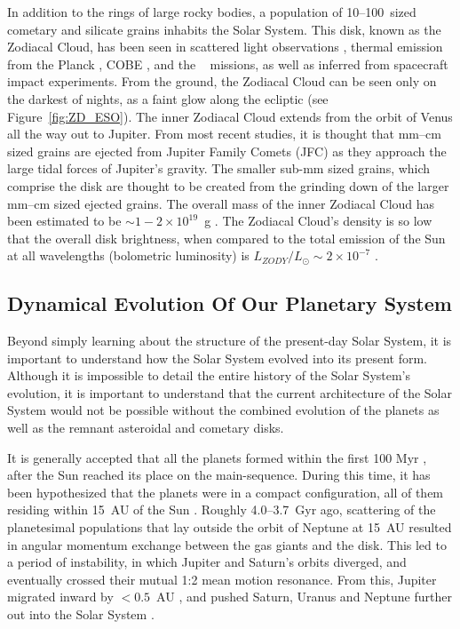     
    In addition to the rings of large rocky bodies, a population of 10--100\micron\ sized cometary and silicate grains inhabits the Solar System. This disk, known as the Zodiacal Cloud, has been seen in scattered light observations \citep{Hahn2002}, thermal emission from the Planck \citep{Maris2006, Ade2014}, COBE \citep{Kelsall1998}, and the \iras\ \citep{Sykes1990} missions, as well as inferred from spacecraft impact experiments. From the ground, the Zodiacal Cloud can be seen only on the darkest of nights, as a faint glow along the ecliptic (see Figure~\ref{fig:ZD_ESO}). The inner Zodiacal Cloud extends from the orbit of Venus all the way out to Jupiter. From most recent studies, it is thought that mm--cm sized grains are ejected from Jupiter Family Comets (JFC) as they approach the large tidal forces of Jupiter's gravity. The smaller sub-mm sized grains, which comprise the disk are thought to be created from the grinding down of the larger mm--cm sized ejected grains. The overall mass of the inner Zodiacal Cloud has been estimated to be $\sim1-2\times10^{19}$~g \citep{Nesvorny2010}. The Zodiacal Cloud's density is so low that the overall disk brightness, when compared to the total emission of the Sun at all wavelengths (bolometric luminosity) is $L_{ZODY}/L_\odot \sim 2\times10^{-7}$ \citep{Nesvorny2010}. 


    
    \subsection{Dynamical Evolution Of Our Planetary System}\label{sec:solar_system}
    
    Beyond simply learning about the structure of the present-day Solar System, it is important to understand how the Solar System evolved into its present form. Although it is impossible to detail the entire history of the Solar System's evolution, it is important to understand that the current architecture of the Solar System would not be possible without the combined evolution of the planets as well as the remnant asteroidal and cometary disks. 
    
    It is generally accepted that all the planets formed within the first 100 Myr \citep[upper limit based on the final accretion time to create Earth;][]{Allegre2008}, after the Sun reached its place on the main-sequence. During this time, it has been hypothesized that the planets were in a compact configuration, all of them residing within 15~AU of the Sun \citep{Batygin2010}. Roughly 4.0--3.7~Gyr ago, scattering of the planetesimal populations that lay outside the orbit of Neptune at 15~AU resulted in angular momentum exchange between the gas giants and the disk. This led to a period of instability, in which Jupiter and Saturn's orbits diverged, and eventually crossed their mutual 1:2 mean motion resonance. From this, Jupiter migrated inward by $<0.5$~AU \citep{Morbidelli2010}, and pushed Saturn, Uranus and Neptune further out into the Solar System \citep{Tsiganis2005}. 
    
